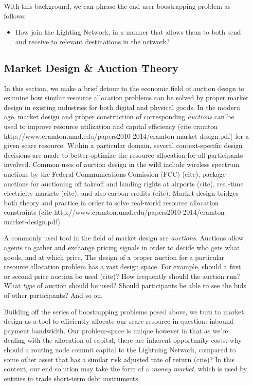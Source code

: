 \documentclass[12pt,a4paper]{article}
\theoremstyle{definition}
\begin{document}
With this background, we can phrase the end user boostrapping problem as
follows:

\begin{itemize}
        \item How join the Lighting Network, in a manner that allows them to
            both send and receive to relevant destinations in the network?
\end{itemize}


\subsection{Market Design \& Auction Theory}

In this section, we make a brief detour to the economic field of auction design
to examine how similar resource allocation problems can be solved by proper
market design in existing industries for both digital and physical goods. In
the modern age, market design and proper construction of corresponding
\emph{auctions} can be used to improve resource utilization and capital
efficiency (cite cramton
http://www.cramton.umd.edu/papers2010-2014/cramton-market-design.pdf) for a
given scare resource. Within a particular domain, several context-specific
design decisions are made to better optimize the resource allocation for all
participants involved. Common uses of auction design in the wild include
wireless spectrum auctions by the Federal Communications Comission (FCC)
(cite), package auctions for auctioning off takeoff and landing rights at
airports (cite), real-time electricity markets (cite), and also carbon credits
(cite). Market design bridges both theory and practice in order to solve
real-world resource allocation constraints (cite
http://www.cramton.umd.edu/papers2010-2014/cramton-market-design.pdf).


A commonly used tool in the field of market design are \emph{auctions}.
Auctions allow agents to gather and exchange pricing signals in order to decide
who gets what goods, and at which price. The design of a proper auction for a
particular resource allocation problem has a vast design space. For example,
should a first or second price auction be used (cite)? How frequently should
the auction run? What \emph{type} of auction should be used? Should
participants be able to see the bids of other participants? And so on.

Building off the series of boostrapping problems posed above, we turn to market
design as a tool to efficiently allocate our scare resource in question:
inbound payment bandwidth. Our problem-space is unique however in that as we're
dealing with the allocation of capital, there are inherent opportunity costs:
why should a routing node commit capital to the Lightning Network, compared to
some other asset that has a similar risk adjusted rate of return (cite)? In
this context, our end solution may take the form of a \emph{money market},
which is used by entities to trade short-term debt instruments.
\end{document}
